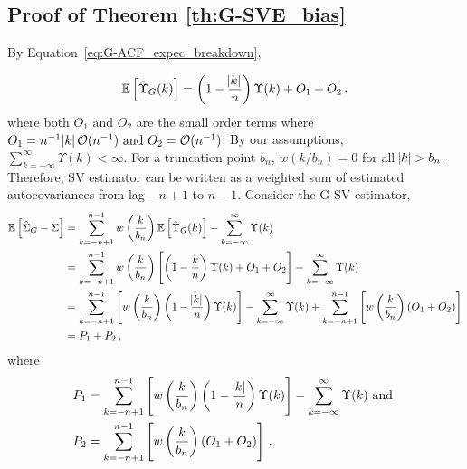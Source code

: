 \documentclass[11pt]{article}
\newcommand{\Var}{\text{Var}}
\newcommand\numberthis{\addtocounter{equation}{1}\tag{\theequation}}
\theoremstyle{remark}
\begin{document}
\subsection{Proof of Theorem \ref{th:G-SVE_bias}}

By Equation~\ref{eq:G-ACF_expec_breakdown},
%

\[
\mathbb{E} \left[\hat{\Upsilon}_{G}(k) \right] = \left(1 - \dfrac{\abs{k}}{n}\right)\Upsilon(k) + O_1 + O_2    \,.
\]
%
where both $O_1 \textrm{ and } O_2$ are the small order terms where $O_1 = n^{-1}\abs{k} \mathcal{O}(n^{-1}) \text{ and } O_2 = \mathcal{O}(n^{-1})$. By our assumptions, $\sum_{k=-\infty}^{\infty}\Upsilon(k) < \infty$.  
For a truncation point $b_n$, $w(k/b_n)=0$ for all $\abs{k} > b_n$. Therefore, SV estimator can be written as a weighted sum of estimated autocovariances from lag $-n+1$ to $n-1$. Consider the G-SV estimator,
\begin{align*}
 \mathbb{E} \left[\hat{\Sigma}_{G} - \Sigma \right] & = \sum_{k=-n+1}^{n-1} w\left(\dfrac{k}{b_n}\right)\mathbb{E} \left[\hat{\Upsilon}_{G}(k) \right] - \sum_{k=-\infty}^{\infty}\Upsilon(k)\\
    &= \sum_{k=-n+1}^{n-1}  w\left(\dfrac{k}{b_n}\right)\left[\left(1-\dfrac{k}{n}\right)\Upsilon(k) + O_1 + O_2 \right]  - \sum_{k=-\infty}^{\infty}\Upsilon(k)\\
    &= \sum_{k=-n+1}^{n-1} \left[ w\left(\dfrac{k}{b_n}\right)\left(1-\dfrac{\abs{k}}{n}\right)\Upsilon(k)\right]  - \sum_{k=-\infty}^{\infty}\Upsilon(k) + \sum_{k=-n+1}^{n-1}\left[  w\left(\dfrac{k}{b_n}\right)  (O_1 + O_2) \right] \\ 
    & = P_1 + P_2\,,
\end{align*}
%
where 
\begin{align*}
    P_1 &= \sum\limits_{k=-n+1}^{n-1}\left[w\left(\dfrac{k}{b_n}\right)\left(1-\dfrac{\abs{k}}{n}\right)\Upsilon(k) \right] - \sum\limits_{k=-\infty}^{\infty}\Upsilon(k) \textrm{ and }\\   
    P_2 &= \sum_{k=-n+1}^{n-1}\left[  w\left(\dfrac{k }{b_n}\right)\left(O_1 + O_2\right)\right]\,.
\end{align*}
\end{document}
